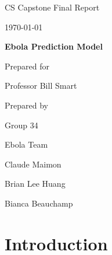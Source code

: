 \documentclass[onecolumn, draftclsnofoot,10pt, compsoc]{IEEEtran}
\def \CapstoneTeamName{		Ebola Team}
\def \CapstoneTeamNumber{		34}
\def \GroupMemberOne{			Claude Maimon}
\def \GroupMemberTwo{			Brian Lee Huang}
\def \GroupMemberThree{			Bianca Beauchamp}
\def \CapstoneProjectName{		Ebola Prediction Model}
\def \CapstoneSponsorCompany{	Professor Bill Smart}
\def \DocType{		Final Report
}
\newcommand{\NameSigPair}[1]{\par
	\makebox[2.75in][r]{#1} \hfil 	\makebox[3.25in]{\makebox[2.25in]{\hrulefill} \hfill		\makebox[.75in]{\hrulefill}}
	\par\vspace{-12pt} \textit{\tiny\noindent
		\makebox[2.75in]{} \hfil		\makebox[3.25in]{\makebox[2.25in][r]{Signature} \hfill	\makebox[.75in][r]{Date}}}}
\renewcommand{\NameSigPair}[1]{#1}
\begin{document}
	\begin{titlepage}
		\begin{singlespace}
			\hfill 
			\par\vspace{.2in}
			\centering
			\scshape{
				\huge CS Capstone \DocType \par
				{\large\today}\par
				\vspace{.5in}
				\textbf{\Huge\CapstoneProjectName}\par
				\vfill
				{\large Prepared for}\par
				\Huge \CapstoneSponsorCompany\par
				\vspace{5pt}
				{\large Prepared by }\par
				Group\CapstoneTeamNumber\par
				\CapstoneTeamName\par 
				\vspace{5pt}
				{\Large
					\NameSigPair{\GroupMemberOne}\par
					\NameSigPair{\GroupMemberTwo}\par
					\NameSigPair{\GroupMemberThree}\par
				}
				\vspace{20pt}
			}
			\begin{abstract}
			There is currently no way to take a persons temperature without being within a close proximity to their bodies, putting health care workers at a great risk of infection. The purpose of this project is to reduce this risk by creating a device that quickly takes a persons core body temperature from a distance using a thermal camera. This report discusses this project, the process of creating it and the outcome. 
			\end{abstract}  
		   
		\end{singlespace}
	\end{titlepage}

	\newpage
	\tableofcontents
	\clearpage
	
	\section{Introduction}
	
\end{document}
